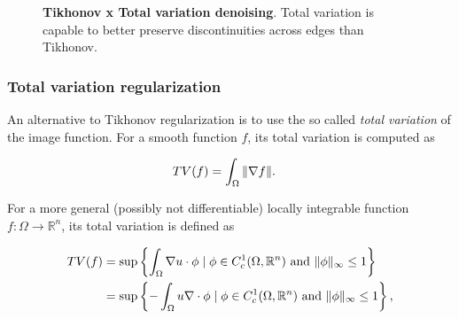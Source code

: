 \begin{figure}
{}%
%
\caption{\textbf{Tikhonov x Total variation denoising}. Total variation is capable to better preserve discontinuities across edges than Tikhonov. }
\label{ch1:fig:denoising-results}
\end{figure}


\subsubsection{Total variation regularization}
An alternative to Tikhonov regularization is to use the so called \emph{total variation} of the image function. For a smooth function $f$, its total variation is computed as

\begin{align*}
	TV(f) &= \int_{\Omega}{ \lVert \nabla f \rVert }.
\end{align*}

For a more general (possibly not differentiable) locally integrable function $f:\Omega \rightarrow \mathbb{R}^n$, its total variation is defined as

\begin{align*}
	TV(f) &= \sup \left\{ \int_{\Omega}{\nabla u \cdot \phi} \; | \; \phi \in C_c^{1}(\Omega, \mathbb{R}^n) \text{ and } \lVert\phi\rVert_{\infty} \leq 1 \right\} \\
		  &= \sup \left\{ - \int_{\Omega}{u \nabla \cdot \phi} \; | \; \phi \in C_c^{1}(\Omega, \mathbb{R}^n) \text{ and } \lVert\phi\rVert_{\infty} \leq 1 \right\},	
\end{align*}


